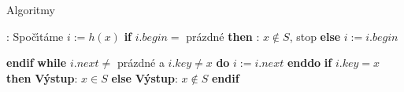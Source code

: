 \subhead
Algoritmy
\endsubhead
\smallskip

:\newline 
Spo\v c\'\i t\'ame $i:=h\left(x\right)$\newline 
{\bf if} $i.begin=$ pr\'azdn\'e {\bf then} \newline 
\phantom{---}{\bf V\'ystup}: $x\notin S$, stop \newline 
{\bf else} \newline
\phantom{---} $i:=i.begin$ \newline 

{\bf endif} \newline 
{\bf while} $i.next\ne$ pr\'azdn\'e a $i.key\ne x$ {\bf do} \newline 
\phantom{---} $i:=i.next$ \newline 
{\bf enddo} \newline
{\bf if} $i.key=x$ {\bf then} \newline 
\phantom{---} {\bf V\'ystup}: $x\in S$ \newline 
{\bf else} \newline 
\phantom{---} {\bf V\'ystup}: $x\notin S$ \newline 
{\bf endif}
\medskip

